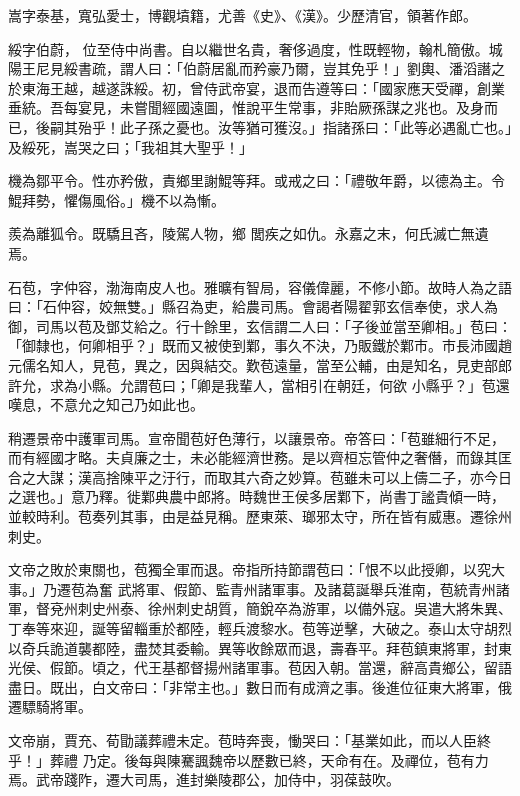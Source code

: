 \begin{pinyinscope}
 嵩字泰基，寬弘愛士，博觀墳籍，尤善《史》、《漢》。少歷清官，領著作郎。



 綏字伯蔚，
 位至侍中尚書。自以繼世名貴，奢侈過度，性既輕物，翰札簡傲。城陽王尼見綏書疏，謂人曰：「伯蔚居亂而矜豪乃爾，豈其免乎！」劉輿、潘滔譖之於東海王越，越遂誅綏。初，曾侍武帝宴，退而告遵等曰：「國家應天受禪，創業垂統。吾每宴見，未嘗聞經國遠圖，惟說平生常事，非貽厥孫謀之兆也。及身而已，後嗣其殆乎！此子孫之憂也。汝等猶可獲沒。」指諸孫曰：「此等必遇亂亡也。」及綏死，嵩哭之曰；「我祖其大聖乎！」



 機為鄒平令。性亦矜傲，責鄉里謝鯤等拜。或戒之曰：「禮敬年爵，以德為主。令鯤拜勢，懼傷風俗。」機不以為慚。



 羨為離狐令。既驕且吝，陵駕人物，鄉
 閭疾之如仇。永嘉之末，何氏滅亡無遺焉。



 石苞，字仲容，渤海南皮人也。雅曠有智局，容儀偉麗，不修小節。故時人為之語曰：「石仲容，姣無雙。」縣召為吏，給農司馬。會謁者陽翟郭玄信奉使，求人為御，司馬以苞及鄧艾給之。行十餘里，玄信謂二人曰：「子後並當至卿相。」苞曰：「御隸也，何卿相乎？」既而又被使到鄴，事久不決，乃販鐵於鄴市。市長沛國趙元儒名知人，見苞，異之，因與結交。歎苞遠量，當至公輔，由是知名，見吏部郎許允，求為小縣。允謂苞曰；「卿是我輩人，當相引在朝廷，何欲
 小縣乎？」苞還嘆息，不意允之知己乃如此也。



 稍遷景帝中護軍司馬。宣帝聞苞好色薄行，以讓景帝。帝答曰：「苞雖細行不足，而有經國才略。夫貞廉之士，未必能經濟世務。是以齊桓忘管仲之奢僭，而錄其匡合之大謀；漢高捨陳平之汙行，而取其六奇之妙算。苞雖未可以上儔二子，亦今日之選也。」意乃釋。徙鄴典農中郎將。時魏世王侯多居鄴下，尚書丁謐貴傾一時，並較時利。苞奏列其事，由是益見稱。歷東萊、瑯邪太守，所在皆有威惠。遷徐州刺史。



 文帝之敗於東關也，苞獨全軍而退。帝指所持節謂苞曰：「恨不以此授卿，以究大事。」乃遷苞為奮
 武將軍、假節、監青州諸軍事。及諸葛誕舉兵淮南，苞統青州諸軍，督兗州刺史州泰、徐州刺史胡質，簡銳卒為游軍，以備外寇。吳遣大將朱異、丁奉等來迎，誕等留輜重於都陸，輕兵渡黎水。苞等逆擊，大破之。泰山太守胡烈以奇兵詭道襲都陸，盡焚其委輸。異等收餘眾而退，壽春平。拜苞鎮東將軍，封東光侯、假節。頃之，代王基都督揚州諸軍事。苞因入朝。當還，辭高貴鄉公，留語盡日。既出，白文帝曰：「非常主也。」數日而有成濟之事。後進位征東大將軍，俄遷驃騎將軍。



 文帝崩，賈充、荀勖議葬禮未定。苞時奔喪，慟哭曰：「基業如此，而以人臣終乎！」葬禮
 乃定。後每與陳騫諷魏帝以歷數已終，天命有在。及禪位，苞有力焉。武帝踐阼，遷大司馬，進封樂陵郡公，加侍中，羽葆鼓吹。




\end{pinyinscope}
